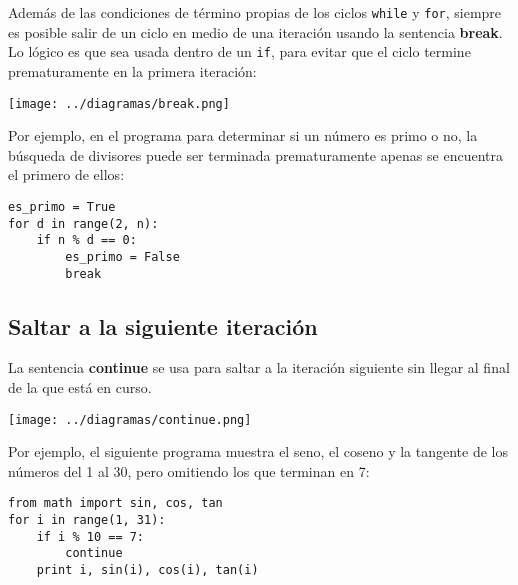 Además de las condiciones de término propias de los ciclos
\lstinline!while! y \lstinline!for!, siempre es posible salir de un
ciclo en medio de una iteración usando la sentencia \textbf{break}. Lo
lógico es que sea usada dentro de un \lstinline!if!, para evitar que el
ciclo termine prematuramente en la primera iteración:

\texttt{[image: ../diagramas/break.png]}

Por ejemplo, en el programa para determinar si un número es primo o no,
la búsqueda de divisores puede ser terminada prematuramente apenas se
encuentra el primero de ellos:

\begin{lstlisting}
es_primo = True
for d in range(2, n):
    if n % d == 0:
        es_primo = False
        break
\end{lstlisting}

\subsection{Saltar a la siguiente iteración}

La sentencia \textbf{continue} se usa para saltar a la iteración
siguiente sin llegar al final de la que está en curso.

\texttt{[image: ../diagramas/continue.png]}

Por ejemplo, el siguiente programa muestra el seno, el coseno y la
tangente de los números del 1 al 30, pero omitiendo los que terminan en
7:

\begin{lstlisting}
from math import sin, cos, tan
for i in range(1, 31):
    if i % 10 == 7:
        continue
    print i, sin(i), cos(i), tan(i)
\end{lstlisting}

